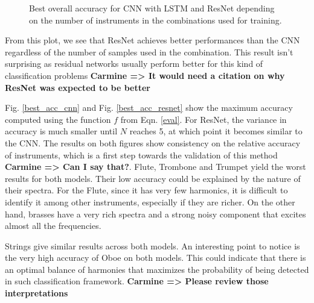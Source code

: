 \documentclass{article}
\newcommand{\carmine}[1]{\textbf{\color{red} Carmine => #1}}
\begin{document}
\begin{figure}
\caption{Best overall accuracy for CNN with LSTM and ResNet depending on the number of instruments in the combinations used for training. \label{cnn_vs_resnet}}
\end{figure}

From this plot, we see that ResNet achieves better performances than the CNN regardless of the number of samples used in the combination. This result isn't surprising as residual networks usually perform better for this kind of classification problems \carmine{It would need a citation on why ResNet was expected to be better}

Fig. \ref{best_acc_cnn} and Fig. \ref{best_acc_resnet} show the maximum accuracy computed using the function $f$ from Eqn. \eqref{eval}. For ResNet, the variance in accuracy is much smaller until $N$ reaches 5, at which point it becomes similar to the CNN. The results on both figures show consistency on the relative accuracy of instruments, which is a first step towards the validation of this method \carmine{Can I say that?}. Flute, Trombone and Trumpet yield the worst results for both models. Their low accuracy could be explained by the nature of their spectra. For the Flute, since it has very few harmonics, it is difficult to identify it among other instruments, especially if they are richer. On the other hand, brasses have a very rich spectra and a strong noisy component that excites almost all the frequencies.

Strings give similar results across both models. An interesting point to notice is the very high accuracy of Oboe on both models. This could indicate that there is an optimal balance of harmonies that maximizes the probability of being detected in such classification framework.\carmine{Please review those interpretations}
\end{document}
